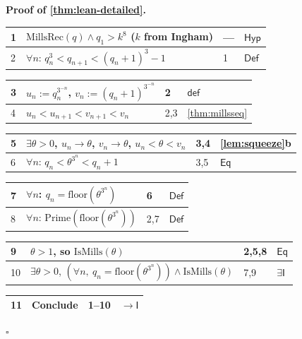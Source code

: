 \documentclass[11pt,reqno]{amsart}
\theoremstyle{blueplain}
\renewcommand{\qedsymbol}{\textcolor{proofqed}{\ensuremath{\square}}}
\renewenvironment{proof}[1][Proof]{\par\noindent\textbf{\textcolor{proofhead}{#1.}}\par\nobreak}{\par\nobreak\hfill\qedsymbol}
\numberwithin{equation}{section}
\begin{document}
\begin{proof}[\textbf{Proof of \cref{thm:lean-detailed}}]
\label{proof:lean-detailed}
{\scriptsize
\begin{tabular}{|m{0.7cm}|m{12cm}|m{1.4cm}|m{2.5cm}|}
\hline
1 & $\mathrm{MillsRec}(q)\wedge q_1>k^8$ ($k$ from Ingham) & --- & $\mathsf{Hyp}$ \\ \hline
2 & $\forall n$: $q_n^3<q_{n+1}<(q_n+1)^3-1$ & 1 & $\mathsf{Def}$ \\
\end{tabular}%
\noindent \newline
\noindent
\begin{tabular}{|m{0.7cm}|m{12cm}|m{1.4cm}|m{2.5cm}|}
\hline
3 & $u_n:=q_n^{3^{-n}}$, $v_n:=(q_n+1)^{3^{-n}}$ & 2 & $\mathsf{def}$ \\ \hline
4 & $u_n<u_{n+1}<v_{n+1}<v_n$ & 2,3 & \cref{thm:millsseq} \\
\end{tabular}%
\noindent \newline
\noindent
\begin{tabular}{|m{0.7cm}|m{12cm}|m{1.4cm}|m{2.5cm}|}
\hline
5 & $\exists\theta>0$, $u_n\to\theta$, $v_n\to\theta$, $u_n<\theta<v_n$ & 3,4 & \cref{lem:squeeze}b \\ \hline
6 & $\forall n$: $q_n<\theta^{3^n}<q_n+1$ & 3,5 & $\mathsf{Eq}$ \\
\end{tabular}%
\noindent \newline
\noindent
\begin{tabular}{|m{0.7cm}|m{12cm}|m{1.4cm}|m{2.5cm}|}
\hline
7 & $\forall n$: $q_n=\mathrm{floor}(\theta^{3^n})$ & 6 & $\mathsf{Def}$ \\ \hline
8 & $\forall n$: $\mathrm{Prime}(\mathrm{floor}(\theta^{3^n}))$ & 2,7 & $\mathsf{Def}$ \\
\end{tabular}%
\noindent \newline
\noindent
\begin{tabular}{|m{0.7cm}|m{12cm}|m{1.4cm}|m{2.5cm}|}
\hline
9 & $\theta>1$, so $\mathrm{IsMills}(\theta)$ & 2,5,8 & $\mathsf{Eq}$ \\ \hline
10 & $\exists\theta>0$, $(\forall n,\ q_n=\mathrm{floor}(\theta^{3^n}))\wedge\mathrm{IsMills}(\theta)$ & 7,9 & $\exists\mathsf{I}$ \\
\end{tabular}%
\noindent \newline
\noindent
\begin{tabular}{|m{0.7cm}|m{12cm}|m{1.4cm}|m{2.5cm}|}
\hline
11 & Conclude & 1--10 & $\rightarrow\mathsf{I}$ \\ \hline
\end{tabular}%
}
\end{proof}
\end{document}
